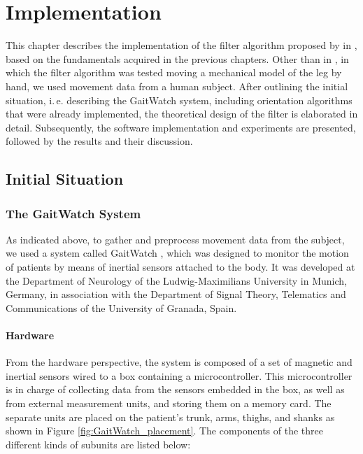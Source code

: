 \chapter{Implementation}
\label{ch:Implementation}

This chapter describes the implementation of the filter algorithm proposed by \citeauthor{bennett_motion_2014} in \cite{bennett_motion_2014}, based on the fundamentals acquired in the previous chapters. Other than in \cite{bennett_motion_2014}, in which the filter algorithm was tested moving a mechanical model of the leg by hand, we used movement data from a human subject. After outlining the initial situation, i.\,e. describing the GaitWatch system, including orientation algorithms that were already implemented, the theoretical design of the filter is elaborated in detail. Subsequently, the software implementation and experiments are presented, followed by the results and their discussion.

\section{Initial Situation}\label{sec:initial_situation}

\subsection{The GaitWatch System}

As indicated above, to gather and preprocess movement data from the subject, we used a system called GaitWatch \cite{olivares_vicente_gaitwatch_2013}, which was designed to monitor the motion of patients by means of inertial sensors attached to the body. It was developed at the Department of Neurology of the Ludwig-Maximilians University in Munich, Germany, in association with the Department of Signal Theory, Telematics and Communications of the University of Granada, Spain.

\subsubsection{Hardware}

From the hardware perspective, the system is composed of a set of magnetic and inertial sensors wired to a box containing a microcontroller. This microcontroller is in charge of collecting data from the sensors embedded in the box, as well as from  external measurement units, and storing them on a memory card. The separate units are placed on the patient's trunk, arms, thighs, and shanks as shown in Figure \ref{fig:GaitWatch_placement}. The components of the three different kinds of subunits are listed below:

